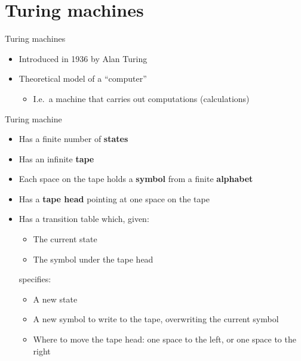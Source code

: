 \part{Turing machines}
\frame{\partpage}

\begin{frame}{Turing machines}
    \begin{itemize}
        \pause\item Introduced in 1936 by Alan Turing
        \pause\item Theoretical model of a ``computer''
            \begin{itemize}
                \pause\item I.e.\ a machine that carries out computations (calculations)
            \end{itemize}
    \end{itemize}
\end{frame}

\begin{frame}{Turing machine}
    \begin{itemize}
        \pause\item Has a finite number of \textbf{states}
        \pause\item Has an infinite \textbf{tape}
        \pause\item Each space on the tape holds a \textbf{symbol} from a finite \textbf{alphabet}
        \pause\item Has a \textbf{tape head} pointing at one space on the tape
        \pause\item Has a transition table which, given:
            \begin{itemize}
                \pause\item The current state
                \pause\item The symbol under the tape head
            \end{itemize}
        \pause specifies:
            \begin{itemize}
                \pause\item A new state
                \pause\item A new symbol to write to the tape, overwriting the current symbol
                \pause\item Where to move the tape head: one space to the left, or one space to the right
            \end{itemize}
    \end{itemize}
\end{frame}

